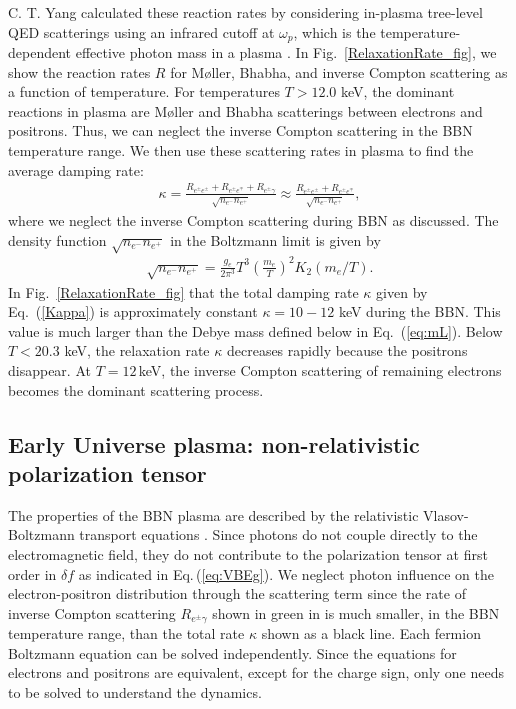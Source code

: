 C. T. Yang calculated these reaction rates by considering in-plasma tree-level QED scatterings using an infrared cutoff at $\omega_p$, which is the temperature-dependent effective photon mass in a plasma \citep{Yang:2024ret}.
In Fig.~\ref{RelaxationRate_fig}, we show the reaction rates $R$ for M{\o}ller, Bhabha, and inverse Compton scattering as a function of temperature. For temperatures $T>12.0$ keV, the dominant reactions in plasma are M{\o}ller and Bhabha scatterings between electrons and positrons. Thus, we can neglect the inverse Compton scattering in the BBN temperature range.
We then use these scattering rates in plasma to find the average damping rate:
\begin{align}\label{Kappa}
\kappa=\frac{R_{e^\pm e^\pm}+R_{e^\pm e^\mp}+R_{e^\pm\gamma}}{\sqrt{n_{e^-}n_{e^+}}}\approx\frac{R_{e^\pm e^\pm}+R_{e^\pm e^\mp}}{\sqrt{n_{e^-}n_{e^+}}},
\end{align}
where we neglect the inverse Compton scattering during BBN as discussed. The density function ${\sqrt{n_{e^-}n_{e^+}}}$ in the Boltzmann limit is given by
\begin{align}
{\sqrt{n_{e^-}n_{e^+}}}=\frac{g_e}{2\pi^3}T^3\left(\frac{m_e}{T}\right)^2K_2(m_e/T).
\end{align}
In Fig.~\ref{RelaxationRate_fig} that the total damping rate $\kappa$ given by Eq.~(\ref{Kappa}) is approximately constant $\kappa=10-12$ keV during the BBN. This value is much larger than the Debye mass defined below in Eq.~(\ref{eq:mL}). Below $T<20.3$ keV, the relaxation rate $\kappa$ decreases rapidly because the positrons disappear. At $T=12$\,keV, the inverse Compton scattering of remaining electrons becomes the dominant scattering process. 

\subsection{Early Universe plasma: non-relativistic polarization tensor}\label{sec:kinetic_theory}
The properties of the BBN plasma are described by the relativistic Vlasov-Boltzmann transport equations . Since photons do not couple directly to the electromagnetic field, they do not contribute to the polarization tensor at first order in $\delta f$ as indicated in Eq.\,(\ref{eq:VBEg}). We neglect photon influence on the electron-positron distribution through the scattering term since the rate of inverse Compton scattering $R_{e^{\pm}\gamma }$ shown in green in  is much smaller, in the BBN temperature range, than the total rate $\kappa$ shown as a black line. Each fermion Boltzmann equation  can be solved independently. Since the equations for electrons and positrons are equivalent, except for the charge sign, only one needs to be solved to understand the dynamics.

